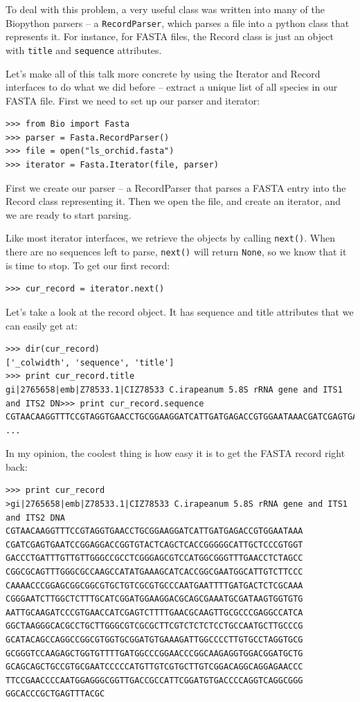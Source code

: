 \documentclass{report}
\begin{document}
To deal with this problem, a very useful class was written into many of the Biopython parsers -- a \verb|RecordParser|, which parses a file into a python class that represents it. For instance, for FASTA files, the Record class is just an object with \verb|title| and \verb|sequence| attributes. 


Let's make all of this talk more concrete by using the Iterator and Record interfaces to do what we did before -- extract a unique list of all species in our FASTA file. First we need to set up our parser and iterator:

\begin{verbatim}
>>> from Bio import Fasta
>>> parser = Fasta.RecordParser()
>>> file = open("ls_orchid.fasta")
>>> iterator = Fasta.Iterator(file, parser)
\end{verbatim}

First we create our parser -- a RecordParser that parses a FASTA entry into the Record class representing it. Then we open the file, and create an iterator, and we are ready to start parsing.


Like most iterator interfaces, we retrieve the objects by calling \verb|next()|. When there are no sequences left to parse, \verb|next()| will return \verb|None|, so we know that it is time to stop. To get our first record:

\begin{verbatim}
>>> cur_record = iterator.next()
\end{verbatim}

Let's take a look at the record object. It has sequence and title attributes that we can easily get at:

\begin{verbatim}
>>> dir(cur_record)
['_colwidth', 'sequence', 'title']
>>> print cur_record.title
gi|2765658|emb|Z78533.1|CIZ78533 C.irapeanum 5.8S rRNA gene and ITS1 and ITS2 DN>>> print cur_record.sequence
CGTAACAAGGTTTCCGTAGGTGAACCTGCGGAAGGATCATTGATGAGACCGTGGAATAAACGATCGAGTGAATCCGGA
...
\end{verbatim}

In my opinion, the coolest thing is how easy it is to get the FASTA record right back:

\begin{verbatim}
>>> print cur_record
>gi|2765658|emb|Z78533.1|CIZ78533 C.irapeanum 5.8S rRNA gene and ITS1 and ITS2 DNA
CGTAACAAGGTTTCCGTAGGTGAACCTGCGGAAGGATCATTGATGAGACCGTGGAATAAA
CGATCGAGTGAATCCGGAGGACCGGTGTACTCAGCTCACCGGGGGCATTGCTCCCGTGGT
GACCCTGATTTGTTGTTGGGCCGCCTCGGGAGCGTCCATGGCGGGTTTGAACCTCTAGCC
CGGCGCAGTTTGGGCGCCAAGCCATATGAAAGCATCACCGGCGAATGGCATTGTCTTCCC
CAAAACCCGGAGCGGCGGCGTGCTGTCGCGTGCCCAATGAATTTTGATGACTCTCGCAAA
CGGGAATCTTGGCTCTTTGCATCGGATGGAAGGACGCAGCGAAATGCGATAAGTGGTGTG
AATTGCAAGATCCCGTGAACCATCGAGTCTTTTGAACGCAAGTTGCGCCCGAGGCCATCA
GGCTAAGGGCACGCCTGCTTGGGCGTCGCGCTTCGTCTCTCTCCTGCCAATGCTTGCCCG
GCATACAGCCAGGCCGGCGTGGTGCGGATGTGAAAGATTGGCCCCTTGTGCCTAGGTGCG
GCGGGTCCAAGAGCTGGTGTTTTGATGGCCCGGAACCCGGCAAGAGGTGGACGGATGCTG
GCAGCAGCTGCCGTGCGAATCCCCCATGTTGTCGTGCTTGTCGGACAGGCAGGAGAACCC
TTCCGAACCCCAATGGAGGGCGGTTGACCGCCATTCGGATGTGACCCCAGGTCAGGCGGG
GGCACCCGCTGAGTTTACGC
\end{verbatim}
\end{document}
